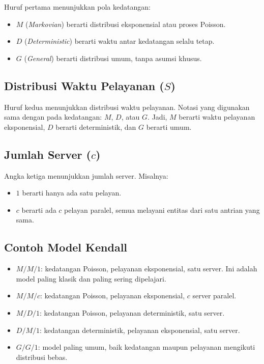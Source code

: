 \documentclass{bukumjh}
\begin{document}
Huruf pertama menunjukkan pola kedatangan:
\begin{itemize}
    \item $M$ (\textit{Markovian}) berarti distribusi eksponensial atau proses Poisson.
    \item $D$ (\textit{Deterministic}) berarti waktu antar kedatangan selalu tetap.
    \item $G$ (\textit{General}) berarti distribusi umum, tanpa asumsi khusus.
\end{itemize}

\subsection{Distribusi Waktu Pelayanan ($S$)}

Huruf kedua menunjukkan distribusi waktu pelayanan. Notasi yang digunakan sama dengan pada kedatangan: $M$, $D$, atau $G$. Jadi, $M$ berarti waktu pelayanan eksponensial, $D$ berarti deterministik, dan $G$ berarti umum.

\subsection{Jumlah Server ($c$)}

Angka ketiga menunjukkan jumlah server. Misalnya:
\begin{itemize}
    \item $1$ berarti hanya ada satu pelayan.
    \item $c$ berarti ada $c$ pelayan paralel, semua melayani entitas dari satu antrian yang sama.
\end{itemize}

\subsection{Contoh Model Kendall}

\begin{itemize}
    \item $M/M/1$: kedatangan Poisson, pelayanan eksponensial, satu server. Ini adalah model paling klasik dan paling sering dipelajari.
    \item $M/M/c$: kedatangan Poisson, pelayanan eksponensial, $c$ server paralel.
    \item $M/D/1$: kedatangan Poisson, pelayanan deterministik, satu server.
    \item $D/M/1$: kedatangan deterministik, pelayanan eksponensial, satu server.
    \item $G/G/1$: model paling umum, baik kedatangan maupun pelayanan mengikuti distribusi bebas.
\end{itemize}
\end{document}
